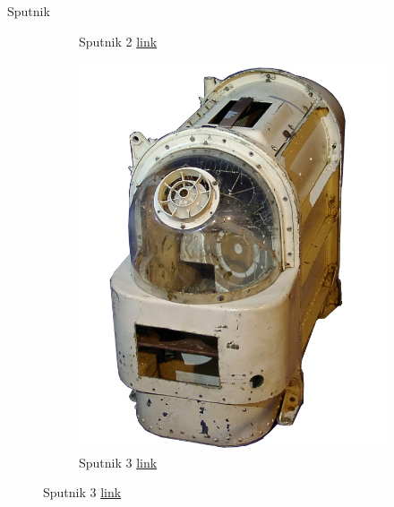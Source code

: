 \begin{frame}[fragile]{Sputnik}
\begin{figure}
\begin{subfigure}{0.33\textwidth}
			\caption{Sputnik 2 \href{http://www.alas-rojas.com/1-2.htm}{link}}
		\end{subfigure}
		\pause
		\begin{subfigure}{0.32\textwidth}
			\centering
			\includegraphics[scale=0.4]{./EtapaPrimeriza/imagenes/s10.jpg}
			\caption{Sputnik 3 \href{https://es.wikipedia.org/wiki/Sputnik\_10\#/media/File:Russian\_space\_dog\_box.jpg}{link}}
		\end{subfigure}
	\end{figure}
\end{frame}

